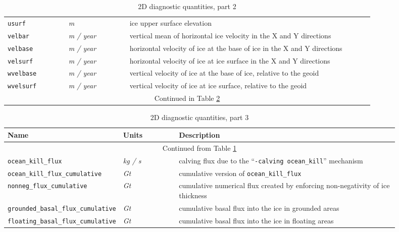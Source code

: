 \begin{table}[ht]
\begin{tabular}{p{0.15\linewidth}p{0.15\linewidth}p{0.6\linewidth}}
    \texttt{usurf} & \textsl{m} & ice upper surface elevation \\
    \texttt{velbar} & \textsl{m / year} &  vertical mean of horizontal ice velocity in the X and Y directions \\
    \texttt{velbase} & \textsl{m / year} &  horizontal velocity of ice at the base of ice in the X and Y directions\\
    \texttt{velsurf} & \textsl{m / year} &  horizontal velocity of ice at ice surface in the X and Y directions\\
    \texttt{wvelbase} & \textsl{m / year} &  vertical velocity of ice at the base of ice, relative to the geoid \\
    \texttt{wvelsurf} & \textsl{m / year} &  vertical velocity of ice at ice surface, relative to the geoid \\
   \multicolumn{3}{c}{Continued in Table \ref{tab:two-d-diagnostics-3}}\\
  \bottomrule
  \end{tabular}
  \caption{2D diagnostic quantities, part 2}
  \label{tab:two-d-diagnostics-2}
\end{table}

\begin{table}[ht]
  \centering
  \begin{tabular}{p{0.15\linewidth}p{0.15\linewidth}p{0.6\linewidth}}
    \toprule
    \textbf{Name} & \textbf{Units} & \textbf{Description} \\
    \midrule
    \multicolumn{3}{c}{Continued from Table \ref{tab:two-d-diagnostics-2}}\\
    \texttt{ocean_kill_flux} & \textsl{kg / s} & calving flux due to the ``\texttt{-calving ocean_kill}'' mechanism \\
    \texttt{ocean_kill_flux_cumulative} & \textsl{Gt} & cumulative version of \texttt{ocean_kill_flux} \\
    \texttt{nonneg_flux_cumulative} & \textsl{Gt} & cumulative numerical flux created by enforcing non-negativity of ice thickness \\
    \texttt{grounded_basal_flux_cumulative} & \textsl{Gt} & cumulative basal flux into the ice in grounded areas \\
    \texttt{floating_basal_flux_cumulative} & \textsl{Gt} & cumulative basal flux into the ice in floating areas \\
  \bottomrule
  \end{tabular}
  \caption{2D diagnostic quantities, part 3}
  \label{tab:two-d-diagnostics-3}
\end{table}


